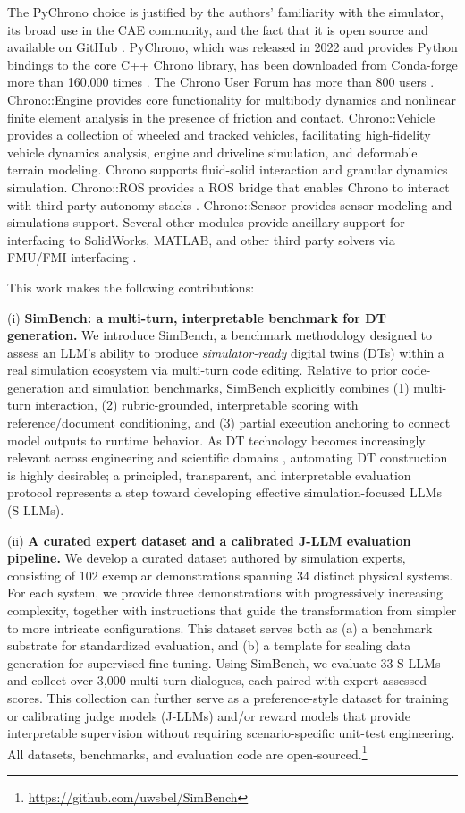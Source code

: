 \documentclass{ieeeaccess}
\begin{document}
The PyChrono choice is justified by the authors' familiarity with the simulator, its broad use in the CAE community, and the fact that it is open source and available on GitHub \cite{projectChronoGithub,projectChronoWebSite}. PyChrono, which was released in 2022 and provides Python bindings to the core C++ Chrono library, has been downloaded from Conda-forge more than 160,000 times \cite{chronodownload}. The Chrono User Forum has more than 800 users \cite{projectChronoForum}. Chrono::Engine provides core functionality for multibody dynamics and nonlinear finite element analysis in the presence of friction and contact. Chrono::Vehicle provides a collection of wheeled and tracked vehicles, facilitating high-fidelity vehicle dynamics analysis, engine and driveline simulation, and deformable terrain modeling. Chrono supports fluid-solid interaction and granular dynamics simulation. Chrono::ROS provides a ROS bridge that enables Chrono to interact with third party autonomy stacks \cite{ROS-2009}. Chrono::Sensor provides sensor modeling and simulations support. Several other modules provide ancillary support for interfacing to SolidWorks, MATLAB, and other third party solvers via FMU/FMI interfacing \cite{FMI_3.0}.

This work makes the following contributions:

(i) \textbf{SimBench: a multi-turn, interpretable benchmark for DT generation.} We introduce SimBench, a benchmark methodology designed to assess an LLM's ability to produce \emph{simulator-ready} digital twins (DTs) within a real simulation ecosystem via multi-turn code editing. Relative to prior code-generation and simulation benchmarks, SimBench explicitly combines (1) multi-turn interaction, (2) rubric-grounded, interpretable scoring with reference/document conditioning, and (3) partial execution anchoring to connect model outputs to runtime behavior. As DT technology becomes increasingly relevant across engineering and scientific domains \cite{digitalTwinReportNAcademies2023}, automating DT construction is highly desirable; a principled, transparent, and interpretable evaluation protocol represents a step toward developing effective simulation-focused LLMs (S-LLMs).

(ii) \textbf{A curated expert dataset and a calibrated J-LLM evaluation pipeline.} We develop a curated dataset authored by simulation experts, consisting of 102 exemplar demonstrations spanning 34 distinct physical systems. For each system, we provide three demonstrations with progressively increasing complexity, together with instructions that guide the transformation from simpler to more intricate configurations. This dataset serves both as (a) a benchmark substrate for standardized evaluation, and (b) a template for scaling data generation for supervised fine-tuning. Using SimBench, we evaluate 33 S-LLMs and collect over 3{,}000 multi-turn dialogues, each paired with expert-assessed scores. This collection can further serve as a preference-style dataset for training or calibrating judge models (J-LLMs) and/or reward models that provide interpretable supervision without requiring scenario-specific unit-test engineering. All datasets, benchmarks, and evaluation code are open-sourced.\footnote{\url{https://github.com/uwsbel/SimBench}}
\end{document}
